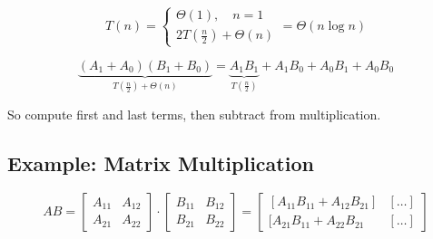 \documentclass[12pt]{article}
\begin{document}
\begin{equation}
    T(n) = \begin{cases}
        \Theta(1),\quad n=1\\
        2T\left( \frac{n}{2} \right) + \Theta(n)
    \end{cases} = \Theta(n \log n)
\end{equation}

\begin{equation}
    \underbrace{(A_1 + A_0)(B_1 + B_0)}_{T\left( \frac{n}{2} \right) +
    \Theta(n)} =\underbrace{ A_1 B_1}_{T\left( \frac{n}{2} \right)} + A_1 B_0 + A_0 B_1 + A_0 B_0
\end{equation}

So compute first and last terms, then subtract from multiplication.

\subsection{Example: Matrix Multiplication}

\begin{equation}
    AB = 
    \left[
    \begin{matrix}
        A_{11} & A_{12}\\
        A_{21} & A_{22}
    \end{matrix}
    \right]
    \cdot
    \left[
    \begin{matrix}
        B_{11} & B_{12}\\
        B_{21} & B_{22}
    \end{matrix}
    \right]
    =
    \left[
    \begin{matrix}
        [A_{11}B_{11} + A_{12}B_{21}]  & [\dots]\\
        [A_{21}B_{11} + A_{22}B_{21} & [\dots]
    \end{matrix}
    \right]
\end{equation}
\end{document}
